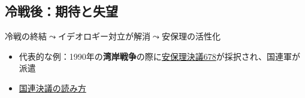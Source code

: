 \documentclass[
  xelatex,
  ja=standard]{bxjsarticle}
\providecommand{\tightlist}{%
  \setlength{\itemsep}{0pt}\setlength{\parskip}{0pt}}\usepackage{longtable,booktabs,array}
\begin{document}
\hypertarget{ux51b7ux6226ux5f8cux671fux5f85ux3068ux5931ux671b}{%
\subsection{冷戦後：期待と失望}\label{ux51b7ux6226ux5f8cux671fux5f85ux3068ux5931ux671b}}

冷戦の終結\(\leadsto\)イデオロギー対立が解消\(\leadsto\)安保理の活性化

\begin{itemize}
\tightlist
\item
  代表的な例：1990年の\textbf{湾岸戦争}の際に\href{https://digitallibrary.un.org/record/102245}{安保理決議678}が採択され、国連軍が派遣
\item
  \href{https://research.un.org/en/docs/resolutions}{国連決議の読み方}
\end{itemize}
\end{document}
